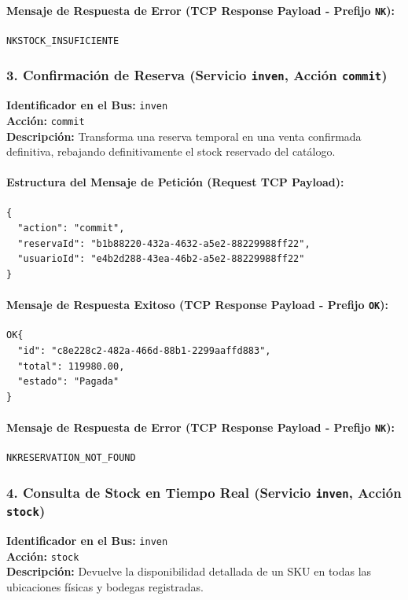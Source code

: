 \documentclass[12pt,a4paper]{article}
\begin{document}
\paragraph{Mensaje de Respuesta de Error (TCP Response Payload - Prefijo \texttt{NK}):}
\begin{verbatim}
NKSTOCK_INSUFICIENTE
\end{verbatim}

\subsubsection{3. Confirmación de Reserva (Servicio \texttt{inven}, Acción \texttt{commit})}
\textbf{Identificador en el Bus:} \texttt{inven} \\
\textbf{Acción:} \texttt{commit} \\
\textbf{Descripción:} Transforma una reserva temporal en una venta confirmada definitiva, rebajando definitivamente el stock reservado del catálogo.

\paragraph{Estructura del Mensaje de Petición (Request TCP Payload):}
\begin{verbatim}
{
  "action": "commit",
  "reservaId": "b1b88220-432a-4632-a5e2-88229988ff22",
  "usuarioId": "e4b2d288-43ea-46b2-a5e2-88229988ff22"
}
\end{verbatim}

\paragraph{Mensaje de Respuesta Exitoso (TCP Response Payload - Prefijo \texttt{OK}):}
\begin{verbatim}
OK{
  "id": "c8e228c2-482a-466d-88b1-2299aaffd883",
  "total": 119980.00,
  "estado": "Pagada"
}
\end{verbatim}

\paragraph{Mensaje de Respuesta de Error (TCP Response Payload - Prefijo \texttt{NK}):}
\begin{verbatim}
NKRESERVATION_NOT_FOUND
\end{verbatim}

\subsubsection{4. Consulta de Stock en Tiempo Real (Servicio \texttt{inven}, Acción \texttt{stock})}
\textbf{Identificador en el Bus:} \texttt{inven} \\
\textbf{Acción:} \texttt{stock} \\
\textbf{Descripción:} Devuelve la disponibilidad detallada de un SKU en todas las ubicaciones físicas y bodegas registradas.
\end{document}
